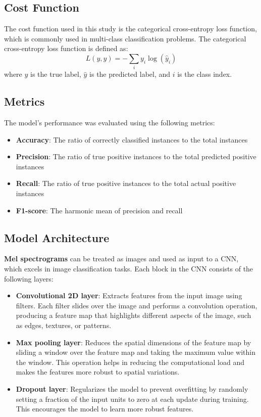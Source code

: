 \documentclass[11.5pt]{article}
\begin{document}
\subsection{Cost Function}
The cost function used in this study is the categorical cross-entropy loss function, which is commonly used in multi-class classification problems. The categorical cross-entropy loss function is defined as:
\begin{equation}
    L(y, \hat{y}) = -\sum_{i} y_i \log(\hat{y}_i)
\end{equation}
where $y$ is the true label, $\hat{y}$ is the predicted label, and $i$ is the class index.

\subsection{Metrics}
The model's performance was evaluated using the following metrics:
\begin{itemize}
    \item \textbf{Accuracy}: The ratio of correctly classified instances to the total instances
    \item \textbf{Precision}: The ratio of true positive instances to the total predicted positive instances
    \item \textbf{Recall}: The ratio of true positive instances to the total actual positive instances
    \item \textbf{F1-score}: The harmonic mean of precision and recall
\end{itemize}

\subsection{Model Architecture}
\textbf{Mel spectrograms} can be treated as images and used as input to a CNN, which excels in image classification tasks. Each block in the CNN consists of the following layers:
\begin{itemize}
    \item \textbf{Convolutional 2D layer}: Extracts features from the input image using filters. Each filter slides over the image and performs a convolution operation, producing a feature map that highlights different aspects of the image, such as edges, textures, or patterns.
    \item \textbf{Max pooling layer}: Reduces the spatial dimensions of the feature map by sliding a window over the feature map and taking the maximum value within the window. This operation helps in reducing the computational load and makes the features more robust to spatial variations.
    \item \textbf{Dropout layer}: Regularizes the model to prevent overfitting by randomly setting a fraction of the input units to zero at each update during training. This encourages the model to learn more robust features.
\end{itemize}
\end{document}

